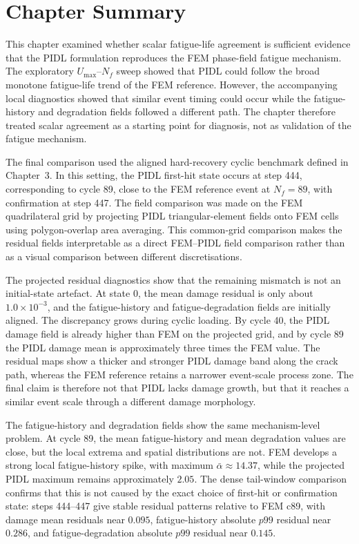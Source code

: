  \section{Chapter Summary}
\label{sec:c4_summary}

This chapter examined whether scalar fatigue-life agreement is sufficient evidence that the PIDL formulation reproduces the FEM phase-field fatigue mechanism. The exploratory \(U_{\max}\)--\(N_f\) sweep showed that PIDL could follow the broad monotone fatigue-life trend of the FEM reference. However, the accompanying local diagnostics showed that similar event timing could occur while the fatigue-history and degradation fields followed a different path. The chapter therefore treated scalar agreement as a starting point for diagnosis, not as validation of the fatigue mechanism.

The final comparison used the aligned hard-recovery cyclic benchmark defined in Chapter~3. In this setting, the PIDL first-hit state occurs at step 444, corresponding to cycle 89, close to the FEM reference event at \(N_f=89\), with confirmation at step 447. The field comparison was made on the FEM quadrilateral grid by projecting PIDL triangular-element fields onto FEM cells using polygon-overlap area averaging. This common-grid comparison makes the residual fields interpretable as a direct FEM--PIDL field comparison rather than as a visual comparison between different discretisations.

The projected residual diagnostics show that the remaining mismatch is not an initial-state artefact. At state 0, the mean damage residual is only about \(1.0\times10^{-3}\), and the fatigue-history and fatigue-degradation fields are initially aligned. The discrepancy grows during cyclic loading. By cycle 40, the PIDL damage field is already higher than FEM on the projected grid, and by cycle 89 the PIDL damage mean is approximately three times the FEM value. The residual maps show a thicker and stronger PIDL damage band along the crack path, whereas the FEM reference retains a narrower event-scale process zone. The final claim is therefore not that PIDL lacks damage growth, but that it reaches a similar event scale through a different damage morphology.

The fatigue-history and degradation fields show the same mechanism-level problem. At cycle 89, the mean fatigue-history and mean degradation values are close, but the local extrema and spatial distributions are not. FEM develops a strong local fatigue-history spike, with maximum \(\bar{\alpha}\approx14.37\), while the projected PIDL maximum remains approximately \(2.05\). The dense tail-window comparison confirms that this is not caused by the exact choice of first-hit or confirmation state: steps 444--447 give stable residual patterns relative to FEM c89, with damage mean residuals near \(0.095\), fatigue-history absolute \(p99\) residual near \(0.286\), and fatigue-degradation absolute \(p99\) residual near \(0.145\).

